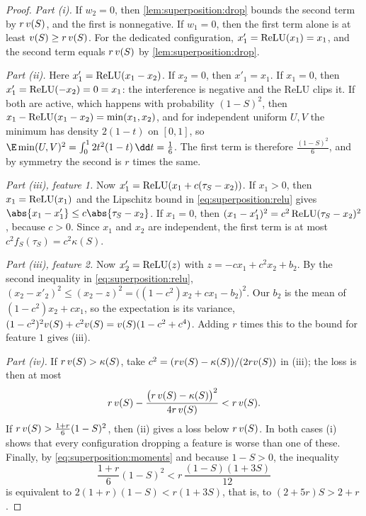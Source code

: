 \begin{refsection}
\begin{proof}
\emph{Part (i).} If $w_2=0$, then \cref{lem:superposition:drop} bounds the second term by $r\,v(S)$, and the first is nonnegative. If $w_1=0$, then the first term alone is at least $v(S)\ge r\,v(S)$. For the dedicated configuration, $x'_1=\operatorname{ReLU}(x_1)=x_1$, and the second term equals $r\,v(S)$ by \cref{lem:superposition:drop}.

\emph{Part (ii).} Here $x'_1=\operatorname{ReLU}(x_1-x_2)$. If $x_2=0$, then $x'_1=x_1$. If $x_1=0$, then $x'_1=\operatorname{ReLU}(-x_2)=0=x_1$: the interference is negative and the ReLU clips it. If both are active, which happens with probability $(1-S)^2$, then $x_1-\operatorname{ReLU}(x_1-x_2)=\min(x_1,x_2)$, and for independent uniform $U,V$ the minimum has density $2(1-t)$ on $[0,1]$, so $\E\min(U,V)^2=\int_0^12t^2(1-t)\,\dd t=\frac16$. The first term is therefore $\frac{(1-S)^2}6$, and by symmetry the second is $r$ times the same.

\emph{Part (iii), feature 1.} Now $x'_1=\operatorname{ReLU}(x_1+c(\tau_S-x_2))$. If $x_1>0$, then $x_1=\operatorname{ReLU}(x_1)$ and the Lipschitz bound in \eqref{eq:superposition:relu} gives $\abs{x_1-x'_1}\le c\abs{\tau_S-x_2}$. If $x_1=0$, then $(x_1-x'_1)^2=c^2\operatorname{ReLU}(\tau_S-x_2)^2$, because $c>0$. Since $x_1$ and $x_2$ are independent, the first term is at most $c^2f_S(\tau_S)=c^2\kappa(S)$.

\emph{Part (iii), feature 2.} Now $x'_2=\operatorname{ReLU}(z)$ with $z=-cx_1+c^2x_2+b_2$. By the second inequality in \eqref{eq:superposition:relu}, $(x_2-x'_2)^2\le(x_2-z)^2=\bigl((1-c^2)x_2+cx_1-b_2\bigr)^2$. Our $b_2$ is the mean of $(1-c^2)x_2+cx_1$, so the expectation is its variance, $(1-c^2)^2v(S)+c^2v(S)=v(S)(1-c^2+c^4)$. Adding $r$ times this to the bound for feature $1$ gives (iii).

\emph{Part (iv).} If $r\,v(S)>\kappa(S)$, take $c^2=(rv(S)-\kappa(S))/(2rv(S))$ in (iii); the loss is then at most
\[
  r\,v(S)-\frac{\bigl(r\,v(S)-\kappa(S)\bigr)^2}{4r\,v(S)}<r\,v(S) .
\]
If $r\,v(S)>\frac{1+r}6(1-S)^2$, then (ii) gives a loss below $r\,v(S)$. In both cases (i) shows that every configuration dropping a feature is worse than one of these. Finally, by \eqref{eq:superposition:moments} and because $1-S>0$, the inequality
\[
  \frac{1+r}6(1-S)^2<r\,\frac{(1-S)(1+3S)}{12}
\]
is equivalent to $2(1+r)(1-S)<r(1+3S)$, that is, to $(2+5r)S>2+r$.
\end{proof}


\end{refsection}
